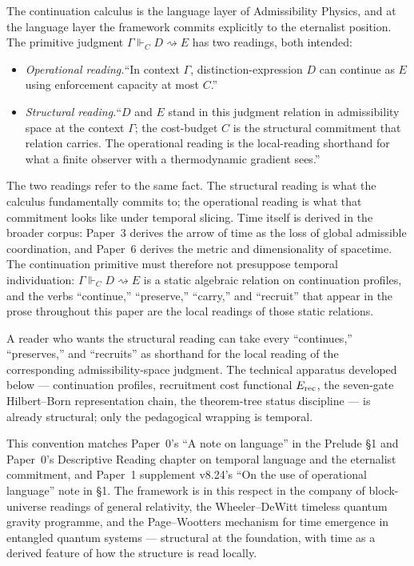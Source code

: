 \documentclass[11pt]{article}
\theoremstyle{remark}
\newcommand{\G}{\Gamma}
\newcommand{\entails}{\Vdash}
\newcommand{\goes}{\rightsquigarrow}
\newcommand{\Erec}{E_{\rm rec}}
\begin{document}
The continuation calculus is the language layer of Admissibility Physics, and at the language layer the framework commits explicitly to the eternalist position.  The primitive judgment $\G\entails_C D\goes E$ has two readings, both intended:
\begin{itemize}
\item \emph{Operational reading.}\quad ``In context $\G$, distinction-expression $D$ can continue as $E$ using enforcement capacity at most $C$.''
\item \emph{Structural reading.}\quad ``$D$ and $E$ stand in this judgment relation in admissibility space at the context $\G$; the cost-budget $C$ is the structural commitment that relation carries.  The operational reading is the local-reading shorthand for what a finite observer with a thermodynamic gradient sees.''
\end{itemize}
The two readings refer to the same fact.  The structural reading is what the calculus fundamentally commits to; the operational reading is what that commitment looks like under temporal slicing.  Time itself is derived in the broader corpus: Paper~3 derives the arrow of time as the loss of global admissible coordination, and Paper~6 derives the metric and dimensionality of spacetime.  The continuation primitive must therefore not presuppose temporal individuation: $\G\entails_C D\goes E$ is a static algebraic relation on continuation profiles, and the verbs ``continue,'' ``preserve,'' ``carry,'' and ``recruit'' that appear in the prose throughout this paper are the local readings of those static relations.

A reader who wants the structural reading can take every ``continues,'' ``preserves,'' and ``recruits'' as shorthand for the local reading of the corresponding admissibility-space judgment.  The technical apparatus developed below --- continuation profiles, recruitment cost functional $\Erec$, the seven-gate Hilbert--Born representation chain, the theorem-tree status discipline --- is already structural; only the pedagogical wrapping is temporal.

This convention matches Paper~0's ``A note on language'' in the Prelude \S1 and Paper~0's Descriptive Reading chapter on temporal language and the eternalist commitment, and Paper~1 supplement v8.24's ``On the use of operational language'' note in \S1.  The framework is in this respect in the company of block-universe readings of general relativity, the Wheeler--DeWitt timeless quantum gravity programme, and the Page--Wootters mechanism for time emergence in entangled quantum systems --- structural at the foundation, with time as a derived feature of how the structure is read locally.
\end{document}
